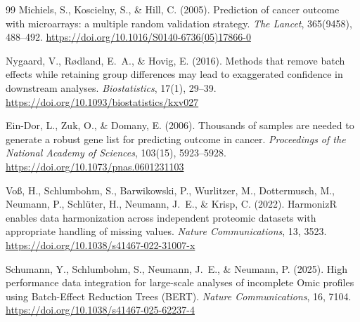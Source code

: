 \documentclass[11pt,a4paper]{article}
\begin{document}
\begin{thebibliography}{99}
Michiels, S., Koscielny, S., \& Hill, C. (2005).
Prediction of cancer outcome with microarrays: a multiple random
validation strategy. \emph{The Lancet}, 365(9458), 488--492.
\url{https://doi.org/10.1016/S0140-6736(05)17866-0}

Nygaard, V., R{\o}dland, E.~A., \& Hovig, E. (2016). Methods that
remove batch effects while retaining group differences may lead
to exaggerated confidence in downstream analyses.
\emph{Biostatistics}, 17(1), 29--39.
\url{https://doi.org/10.1093/biostatistics/kxv027}

Ein-Dor, L., Zuk, O., \& Domany, E. (2006).
Thousands of samples are needed to generate a robust gene list
for predicting outcome in cancer. \emph{Proceedings of the National
Academy of Sciences}, 103(15), 5923--5928.
\url{https://doi.org/10.1073/pnas.0601231103}

Vo{\ss}, H., Schlumbohm, S., Barwikowski, P., Wurlitzer, M.,
Dottermusch, M., Neumann, P., Schl{\"u}ter, H., Neumann, J.~E., \&
Krisp, C. (2022). HarmonizR enables data harmonization across
independent proteomic datasets with appropriate handling of missing
values. \emph{Nature Communications}, 13, 3523.
\url{https://doi.org/10.1038/s41467-022-31007-x}

Schumann, Y., Schlumbohm, S., Neumann, J.~E., \& Neumann, P. (2025).
High performance data integration for large-scale analyses of
incomplete Omic profiles using Batch-Effect Reduction Trees (BERT).
\emph{Nature Communications}, 16, 7104.
\url{https://doi.org/10.1038/s41467-025-62237-4}

\end{thebibliography}
\end{document}
